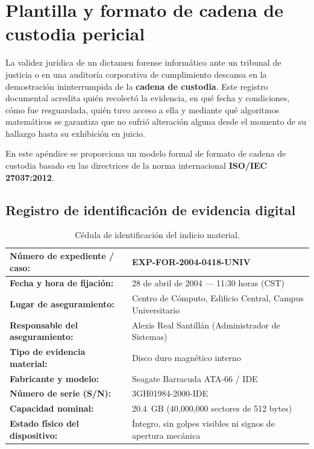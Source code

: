 \chapter{Plantilla y formato de cadena de custodia pericial}

La validez jurídica de un dictamen forense informático ante un tribunal de justicia o en una auditoría corporativa de cumplimiento descansa en la demostración ininterrumpida de la \textbf{cadena de custodia}. Este registro documental acredita quién recolectó la evidencia, en qué fecha y condiciones, cómo fue resguardada, quién tuvo acceso a ella y mediante qué algoritmos matemáticos se garantiza que no sufrió alteración alguna desde el momento de su hallazgo hasta su exhibición en juicio.

En este apéndice se proporciona un modelo formal de formato de cadena de custodia basado en las directrices de la norma internacional \textbf{ISO/IEC 27037:2012}.

\section{Registro de identificación de evidencia digital}

\begin{table}[htbp]
\centering
\small
\begin{tabularx}{\textwidth}{|l|X|}
\hline
\textbf{Número de expediente / caso:} & EXP-FOR-2004-0418-UNIV \\ \hline
\textbf{Fecha y hora de fijación:} & 28 de abril de 2004 --- 11:30 horas (CST) \\ \hline
\textbf{Lugar de aseguramiento:} & Centro de Cómputo, Edificio Central, Campus Universitario \\ \hline
\textbf{Responsable del aseguramiento:} & Alexis Real Santillán (Administrador de Sistemas) \\ \hline
\textbf{Tipo de evidencia material:} & Disco duro magnético interno \\ \hline
\textbf{Fabricante y modelo:} & Seagate Barracuda ATA-66 / IDE \\ \hline
\textbf{Número de serie (S/N):} & 3GH01984-2000-IDE \\ \hline
\textbf{Capacidad nominal:} & 20.4~GB (40,000,000 sectores de 512 bytes) \\ \hline
\textbf{Estado físico del dispositivo:} & Íntegro, sin golpes visibles ni signos de apertura mecánica \\ \hline
\end{tabularx}
\caption{Cédula de identificación del indicio material.}
\end{table}

